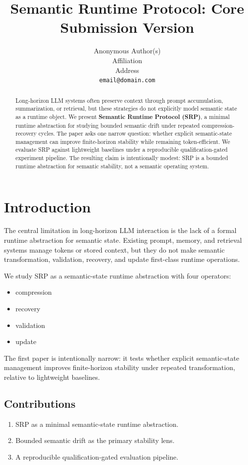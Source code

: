 \documentclass[11pt]{article}
\title{Semantic Runtime Protocol: Core Submission Version}
\author{Anonymous Author(s)\\Affiliation\\Address\\\texttt{email@domain.com}}
\begin{document}
\maketitle

\begin{abstract}
Long-horizon LLM systems often preserve context through prompt accumulation, summarization, or retrieval, but these strategies do not explicitly model semantic state as a runtime object. We present \textbf{Semantic Runtime Protocol (SRP)}, a minimal runtime abstraction for studying bounded semantic drift under repeated compression-recovery cycles. The paper asks one narrow question: whether explicit semantic-state management can improve finite-horizon stability while remaining token-efficient. We evaluate SRP against lightweight baselines under a reproducible qualification-gated experiment pipeline. The resulting claim is intentionally modest: SRP is a bounded runtime abstraction for semantic stability, not a semantic operating system.
\end{abstract}

\section{Introduction}
The central limitation in long-horizon LLM interaction is the lack of a formal runtime abstraction for semantic state. Existing prompt, memory, and retrieval systems manage tokens or stored context, but they do not make semantic transformation, validation, recovery, and update first-class runtime operations.

We study SRP as a semantic-state runtime abstraction with four operators:
\begin{itemize}[leftmargin=*]
  \item compression
  \item recovery
  \item validation
  \item update
\end{itemize}

The first paper is intentionally narrow: it tests whether explicit semantic-state management improves finite-horizon stability under repeated transformation, relative to lightweight baselines.

\subsection*{Contributions}
\begin{enumerate}[leftmargin=*]
  \item SRP as a minimal semantic-state runtime abstraction.
  \item Bounded semantic drift as the primary stability lens.
  \item A reproducible qualification-gated evaluation pipeline.
\end{enumerate}
\end{document}
